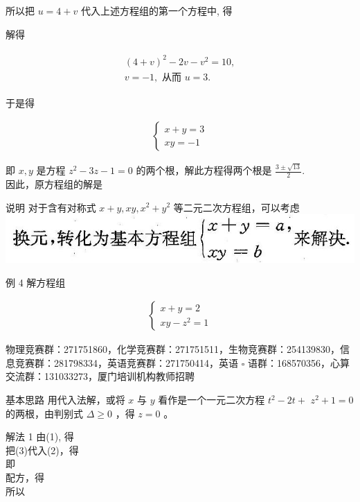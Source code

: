 \documentclass[10pt]{article}
\begin{document}
所以把 $u=4+v$ 代入上述方程组的第一个方程中, 得

解得

\begin{align*}
\begin{gathered}
(4+v)^{2}-2 v-v^{2}=10, \\
v=-1, \text { 从而 } u=3 .
\end{gathered}
\end{align*}

于是得

\begin{align*}
\left\{\begin{array}{l}
x+y=3 \\
x y=-1
\end{array}\right.
\end{align*}

即 $x, y$ 是方程 $z^{2}-3 z-1=0$ 的两个根，解此方程得两个根是 $\frac{3 \pm \sqrt{13}}{2}$.\\
因此，原方程组的解是

说明 对于含有对称式 $x+y, x y, x^{2}+y^{2}$ 等二元二次方程组，可以考虑\\
\includegraphics[max width=\textwidth, center]{2024_10_30_26b590fd1106d28139f0g-088}

例 4 解方程组

\begin{align*}
\left\{\begin{array}{l}
x+y=2  \tag{1}\\
x y-z^{2}=1
\end{array}\right.
\end{align*}

物理竞赛群：271751860，化学竞赛群：271751511，生物竞赛群：254139830，信息竞赛群：281798334，英语竞赛群：271750414，英语 $\square$ 语群：168570356，心算交流群：131033273，厦门培训机构教师招聘

基本思路 用代入法解，或将 $x$ 与 $y$ 看作是一个一元二次方程 $t^{2}-2 t+$ $z^{2}+1=0$ 的两根，由判别式 $\Delta \geqslant 0$ ，得 $z=0$ 。

解法 1 由(1), 得\\
把(3)代入(2)，得\\
即\\
配方，得\\
所以
\end{document}
